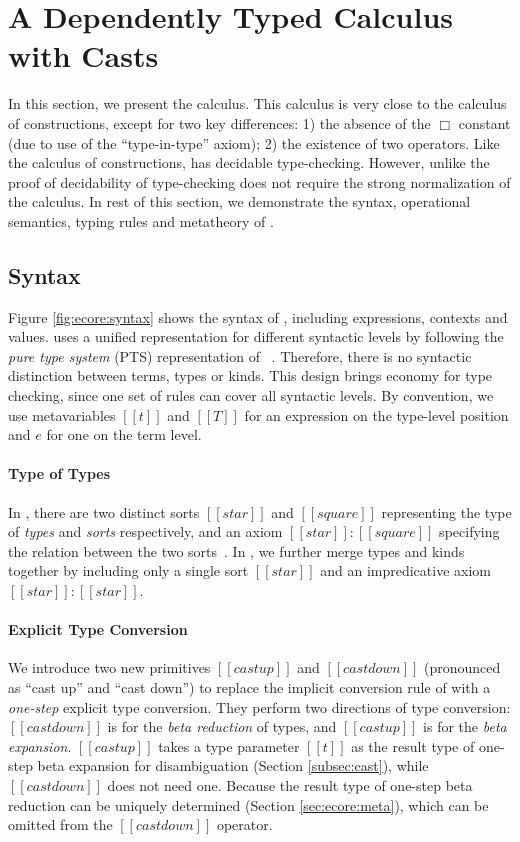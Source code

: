 
\section{A Dependently Typed Calculus with Casts}\label{sec:ecore}

In this section, we present the \ecore calculus. This calculus is very
close to the calculus of constructions, except for two key differences:
1) the absence of the $\Box$ constant (due to use of the
``type-in-type'' axiom); 2) the existence of two \cast operators. Like
the calculus of constructions, \ecore has decidable
type-checking. However, unlike \cc the proof of decidability of
type-checking does not require the strong normalization of the
calculus.  In rest of this section, we demonstrate the syntax,
operational semantics, typing rules and metatheory of \ecore.

\subsection{Syntax}\label{sec:ecore:syn}

Figure \ref{fig:ecore:syntax} shows the syntax of \ecore, including
expressions, contexts and values. \ecore uses a unified 
representation for different syntactic levels by following the
\emph{pure type system} (PTS) representation of \cc~\cite{handbook}. Therefore, there
is no syntactic distinction between terms, types or kinds. This design
brings economy for type checking, since one set of rules can cover
all syntactic levels. By convention, we use metavariables $[[t]]$ and
$[[T]]$ for an expression on the type-level position and $e$ for one
on the term level.

\paragraph{Type of Types}
In \cc, there are two distinct sorts $[[star]]$ and
$[[square]]$ representing the type of \emph{types} and \emph{sorts}
respectively, and an axiom $[[star]]:[[square]]$ specifying the
relation between the two sorts~\cite{handbook}. In \ecore, we further merge types and
kinds together by including only a single sort $[[star]]$ and an
impredicative axiom $[[star]]:[[star]]$.

\paragraph{Explicit Type Conversion}

We introduce two new primitives $[[castup]]$ and $[[castdown]]$
(pronounced as ``cast up'' and ``cast down'') to replace the implicit
conversion rule of \cc with a \emph{one-step} explicit type
conversion. They perform two directions of type conversion:
$[[castdown]]$ is for the \emph{beta reduction} of types, and
$[[castup]]$ is for the \emph{beta expansion}. $[[castup]]$ takes a
type parameter $[[t]]$ as the result type of one-step beta expansion
for disambiguation (Section \ref{subsec:cast}), while $[[castdown]]$
does not need one.  Because the result type of one-step beta reduction
can be uniquely determined (Section \ref{sec:ecore:meta}), which can
be omitted from the $[[castdown]]$ operator.

